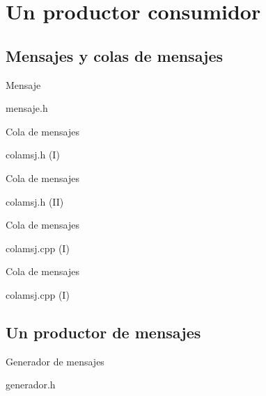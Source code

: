 \section{Un productor consumidor}

\subsection{Mensajes y colas de mensajes}

\begin{frame}{Mensaje}
\begin{block}{mensaje.h}

\end{block}
\end{frame}

\begin{frame}{Cola de mensajes}
\begin{block}{colamsj.h (I)}

\end{block}
\end{frame}

\begin{frame}{Cola de mensajes}
\begin{block}{colamsj.h (II)}

\end{block}
\end{frame}

\begin{frame}{Cola de mensajes}
\begin{block}{colamsj.cpp (I)}

\end{block}
\end{frame}

\begin{frame}{Cola de mensajes}
\begin{block}{colamsj.cpp (I)}

\end{block}
\end{frame}

\subsection{Un productor de mensajes}

\begin{frame}{Generador de mensajes}
\begin{block}{generador.h}

\end{block}
\end{frame}


